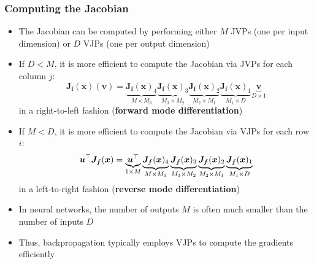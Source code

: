 \documentclass[smaller]{beamer}
\begin{document}
\begin{frame}
  \frametitle{Computing the Jacobian}\pause

  \begin{itemize}
    \item The Jacobian can be computed by performing either $M$ JVPs (one per input dimension) or $D$ VJPs (one per output dimension)
    \item If $D < M$, it is more efficient to compute the Jacobian via JVPs for each column $j$:
      \begin{equation}
        \bm J_{\bm f}(\bm x)(\bm v) = \underbrace{\bm J_{\bm f}(\bm x)_4}_{M \times M_3} \underbrace{\bm J_{\bm f}(\bm x)_3}_{M_3 \times M_2} \underbrace{\bm J_{\bm f}(\bm x)_2}_{M_2 \times M_1} \underbrace{\bm J_{\bm f}(\bm x)_1}_{M_1 \times D} \underbrace{\bm v}_{D \times 1}
      \end{equation}
      in a right-to-left fashion (\textbf{forward mode differentiation})
    \item If $M < D$, it is more efficient to compute the Jacobian via VJPs for each row $i$:
      \begin{equation}
        \bm u^{\top} \bm J_{\bm f}(\bm x) = \underbrace{\bm u^{\top}}_{1 \times M} \underbrace{\bm J_{\bm f}(\bm x)_4}_{M \times M_3} \underbrace{\bm J_{\bm f}(\bm x)_3}_{M_3 \times M_2} \underbrace{\bm J_{\bm f}(\bm x)_2}_{M_2 \times M_1} \underbrace{\bm J_{\bm f}(\bm x)_1}_{M_1 \times D}
      \end{equation}
      in a left-to-right fashion (\textbf{reverse mode differentiation})
    \item In neural networks, the number of outputs $M$ is often much smaller than the number of inputs $D$
    \item Thus, backpropagation typically employs VJPs to compute the gradients efficiently
  \end{itemize}
\end{frame}
\end{document}
